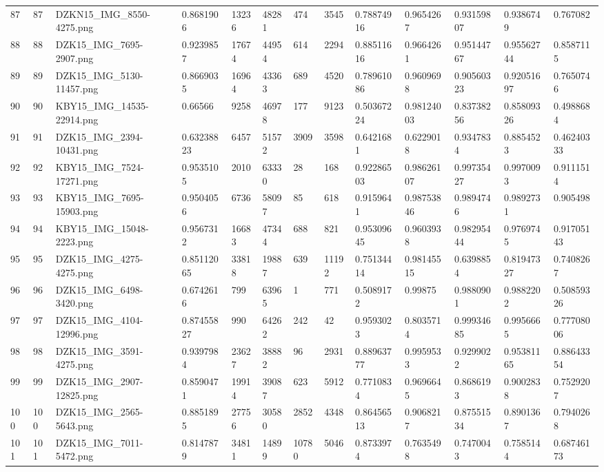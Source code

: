 \documentclass[11pt, a4paper, twoside]{report}
\begin{document}
\begin{longtable}[c]{@{}lllllllllllll@{}}
87 & 87 & DZKN15\_IMG\_8550-4275.png & 0.8681906 & 13236 & 48281 & 474 & 3545 & 0.78874916 & 0.9654267 & 0.93159807 & 0.9386749 & 0.767082 \\
88 & 88 & DZK15\_IMG\_7695-2907.png & 0.9239857 & 17674 & 44954 & 614 & 2294 & 0.88511616 & 0.9664261 & 0.95144767 & 0.95562744 & 0.8587115 \\
89 & 89 & DZK15\_IMG\_5130-11457.png & 0.8669035 & 16964 & 43363 & 689 & 4520 & 0.78961086 & 0.9609698 & 0.90560323 & 0.92051697 & 0.7650746 \\
90 & 90 & KBY15\_IMG\_14535-22914.png & 0.66566 & 9258 & 46978 & 177 & 9123 & 0.50367224 & 0.98124003 & 0.83738256 & 0.85809326 & 0.4988684 \\
91 & 91 & DZK15\_IMG\_2394-10431.png & 0.63238823 & 6457 & 51572 & 3909 & 3598 & 0.6421681 & 0.6229018 & 0.9347834 & 0.8854523 & 0.46240333 \\
92 & 92 & KBY15\_IMG\_7524-17271.png & 0.9535105 & 2010 & 63330 & 28 & 168 & 0.92286503 & 0.98626107 & 0.99735427 & 0.9970093 & 0.9111514 \\
93 & 93 & KBY15\_IMG\_7695-15903.png & 0.9504056 & 6736 & 58097 & 85 & 618 & 0.9159641 & 0.98753846 & 0.9894746 & 0.9892731 & 0.905498 \\
94 & 94 & KBY15\_IMG\_15048-2223.png & 0.9567312 & 16683 & 47344 & 688 & 821 & 0.95309645 & 0.9603938 & 0.98295444 & 0.9769745 & 0.91705143 \\
95 & 95 & DZK15\_IMG\_4275-4275.png & 0.85112065 & 33818 & 19887 & 639 & 11192 & 0.75134414 & 0.98145515 & 0.6398854 & 0.81947327 & 0.7408267 \\
96 & 96 & DZK15\_IMG\_6498-3420.png & 0.6742616 & 799 & 63965 & 1 & 771 & 0.5089172 & 0.99875 & 0.9880901 & 0.9882202 & 0.50859326 \\
97 & 97 & DZK15\_IMG\_4104-12996.png & 0.87455827 & 990 & 64262 & 242 & 42 & 0.9593023 & 0.8035714 & 0.99934685 & 0.9956665 & 0.77708006 \\
98 & 98 & DZK15\_IMG\_3591-4275.png & 0.9397984 & 23627 & 38882 & 96 & 2931 & 0.88963777 & 0.9959533 & 0.9299022 & 0.95381165 & 0.88643354 \\
99 & 99 & DZK15\_IMG\_2907-12825.png & 0.8590471 & 19914 & 39087 & 623 & 5912 & 0.7710834 & 0.9696645 & 0.8686193 & 0.9002838 & 0.7529207 \\
100 & 100 & DZK15\_IMG\_2565-5643.png & 0.8851895 & 27756 & 30580 & 2852 & 4348 & 0.86456513 & 0.9068217 & 0.87551534 & 0.8901367 & 0.7940268 \\
101 & 101 & DZK15\_IMG\_7011-5472.png & 0.8147879 & 34811 & 14899 & 10780 & 5046 & 0.8733974 & 0.7635498 & 0.7470043 & 0.7585144 & 0.68746173 \\

\end{longtable}
\end{document}
